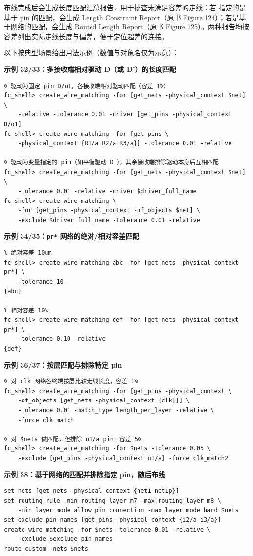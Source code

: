布线完成后会生成长度匹配汇总报告，用于排查未满足容差的走线：若  指定的是基于 pin 的匹配，会生成 Length Constraint Report（原书 Figure 124）；若是基于网络的匹配，会生成 Routed Length Report（原书 Figure 125）。两种报告均按容差列出实际走线长度与偏差，便于定位超差的连接。

以下按典型场景给出用法示例（数值与对象名仅为示意）：

\textbf{示例 32/33：多接收端相对驱动 D（或 D'）的长度匹配}
\begin{lstlisting}
% 驱动为固定 pin D/o1，各接收端相对驱动匹配（容差 1%）
fc_shell> create_wire_matching -for [get_nets -physical_context $net] \
    -relative -tolerance 0.01 -driver [get_pins -physical_context D/o1]
fc_shell> create_wire_matching -for [get_pins \
    -physical_context {R1/a R2/a R3/a}] -tolerance 0.01 -relative

% 驱动为变量指定的 pin（如平衡驱动 D'），其余接收端排除驱动本身后互相匹配
fc_shell> create_wire_matching -for [get_nets -physical_context $net] \
    -tolerance 0.01 -relative -driver $driver_full_name
fc_shell> create_wire_matching \
    -for [get_pins -physical_context -of_objects $net] \
    -exclude $driver_full_name -tolerance 0.01 -relative
\end{lstlisting}

\textbf{示例 34/35：\texttt{pr*} 网络的绝对/相对容差匹配}
\begin{lstlisting}
% 绝对容差 10um
fc_shell> create_wire_matching abc -for [get_nets -physical_context pr*] \
    -tolerance 10
{abc}

% 相对容差 10%
fc_shell> create_wire_matching def -for [get_nets -physical_context pr*] \
    -tolerance 0.10 -relative
{def}
\end{lstlisting}

\textbf{示例 36/37：按层匹配与排除特定 pin}
\begin{lstlisting}
% 对 clk 网络各终端按层比较走线长度，容差 1%
fc_shell> create_wire_matching -for [get_pins -physical_context \
    -of_objects [get_nets -physical_context {clk}]] \
    -tolerance 0.01 -match_type length_per_layer -relative \
    -force clk_match

% 对 $nets 做匹配，但排除 u1/a pin，容差 5%
fc_shell> create_wire_matching -for $nets -tolerance 0.05 \
    -exclude [get_pins -physical_context u1/a] -force clk_match2
\end{lstlisting}

\textbf{示例 38：基于网络的匹配并排除指定 pin，随后布线}
\begin{lstlisting}
set nets [get_nets -physical_context {net1 net1p}]
set_routing_rule -min_routing_layer m7 -max_routing_layer m8 \
    -min_layer_mode allow_pin_connection -max_layer_mode hard $nets
set exclude_pin_names [get_pins -physical_context {i2/a i3/a}]
create_wire_matching -for $nets -tolerance 0.01 -relative \
    -exclude $exclude_pin_names
route_custom -nets $nets
\end{lstlisting}

